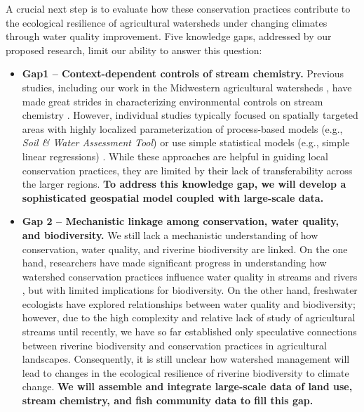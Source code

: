 \documentclass[12pt, class=article, crop=false]{standalone}
\begin{document}
A crucial next step is to evaluate how these conservation practices contribute to the ecological resilience of agricultural watersheds under changing climates through water quality improvement.
Five knowledge gaps, addressed by our proposed research, limit our ability to answer this question:
\begin{itemize}
    \item \textbf{Gap1 -- Context-dependent controls of stream chemistry.} Previous studies, including our work in the Midwestern agricultural watersheds \citep{hansen_wetlands_2016, czuba_contextualizing_2018, dolph_flow-related_2017, hansen_contribution_2018, dolph_phosphorus_2019}, have made great strides in characterizing environmental controls on stream chemistry \citep{mcguire_network_2014, abbott_unexpected_2018, basu_managing_2022}.
    However, individual studies typically focused on spatially targeted areas with highly localized parameterization of process-based models (e.g., \textit{Soil \& Water Assessment Tool}) or use simple statistical models (e.g., simple linear regressions) \citep[but see][for notable exception]{heiner_model-based_2023}.
    While these approaches are helpful in guiding local conservation practices, they are limited by their lack of transferability across the larger regions.
    \textbf{To address this knowledge gap, we will develop a sophisticated geospatial model coupled with large-scale data.}

    \item \textbf{Gap 2 -- Mechanistic linkage among conservation, water quality, and biodiversity.} We still lack a mechanistic understanding of how conservation, water quality, and riverine biodiversity are linked.
    On the one hand, researchers have made significant progress in understanding how watershed conservation practices influence water quality in streams and rivers \citep{hansen_wetlands_2016, czuba_contextualizing_2018, dolph_flow-related_2017, hansen_contribution_2018, dolph_phosphorus_2019}, but with limited implications for biodiversity.
    On the other hand, freshwater ecologists have explored relationships between water quality and biodiversity; however, due to the high complexity and relative lack of study of agricultural streams until recently, we have so far established only speculative connections between riverine biodiversity and conservation practices in agricultural landscapes.
    Consequently, it is still unclear how watershed management will lead to changes in the ecological resilience of riverine biodiversity to climate change. \textbf{We will assemble and integrate large-scale data of land use, stream chemistry, and fish community data to fill this gap.}


\end{itemize}
\end{document}
